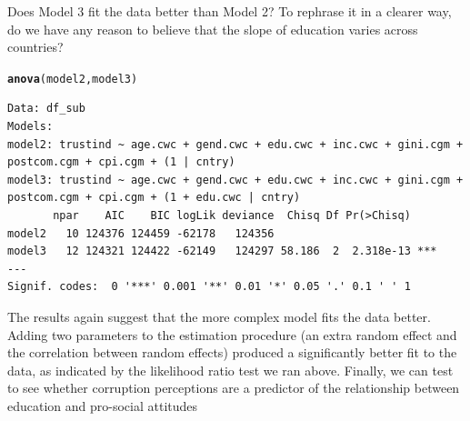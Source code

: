 \documentclass[12pt,english]{article}\usepackage[]{graphicx}\usepackage[usenames, dvipsnames]{xcolor}
\makeatletter
\newcommand{\hlstd}[1]{\textcolor[rgb]{0.345,0.345,0.345}{#1}}%
\newcommand{\hlkwd}[1]{\textcolor[rgb]{0.737,0.353,0.396}{\textbf{#1}}}%
\newenvironment{kframe}{%
 \def\at@end@of@kframe{}%
 \ifinner\ifhmode%
  \def\at@end@of@kframe{\end{minipage}}%
  \begin{minipage}{\columnwidth}%
 \fi\fi%
 \def\FrameCommand##1{\hskip\@totalleftmargin \hskip-\fboxsep
 \colorbox{shadecolor}{##1}\hskip-\fboxsep
     \hskip-\linewidth \hskip-\@totalleftmargin \hskip\columnwidth}%
 \MakeFramed {\advance\hsize-\width
   \@totalleftmargin\z@ \linewidth\hsize
   \@setminipage}}%
 {\par\unskip\endMakeFramed%
 \at@end@of@kframe}
\newenvironment{knitrout}{}{} %
\makeatother
\begin{document}
Does Model 3 fit the data better than Model 2? To rephrase it in a clearer way, do we have any reason to believe that the slope of education varies across countries?

\begin{knitrout}
\color{fgcolor}\begin{kframe}
\begin{alltt}
\hlkwd{anova}\hlstd{(model2, model3)}
\end{alltt}
\begin{verbatim}
Data: df_sub
Models:
model2: trustind ~ age.cwc + gend.cwc + edu.cwc + inc.cwc + gini.cgm + postcom.cgm + cpi.cgm + (1 | cntry)
model3: trustind ~ age.cwc + gend.cwc + edu.cwc + inc.cwc + gini.cgm + postcom.cgm + cpi.cgm + (1 + edu.cwc | cntry)
       npar    AIC    BIC logLik deviance  Chisq Df Pr(>Chisq)    
model2   10 124376 124459 -62178   124356                         
model3   12 124321 124422 -62149   124297 58.186  2  2.318e-13 ***
---
Signif. codes:  0 '***' 0.001 '**' 0.01 '*' 0.05 '.' 0.1 ' ' 1
\end{verbatim}
\end{kframe}
\end{knitrout}

The results again suggest that the more complex model fits the data better. Adding two parameters to the estimation procedure (an extra random effect and the correlation between random effects) produced a significantly better fit to the data, as indicated by the likelihood ratio test we ran above. Finally, we can test to see whether corruption perceptions are a predictor of the relationship between education and pro-social attitudes
\end{document}
